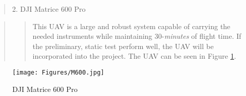 \documentclass{sigchi}
\begin{document}
\begin{quote}
    2. DJI Matrice 600 Pro
\end{quote} 

\begin{quote}
    \begin{quote}
       This UAV is a large and robust system capable of carrying the needed instruments while maintaining 30-\textit{minutes} of flight time. If the preliminary, static test perform well, the UAV will be incorporated into the project. The UAV can be seen in Figure \ref{fig:2}.
    \end{quote}
\end{quote}

\begin{figure}
\centering
    \texttt{[image: Figures/M600.jpg]}
    \caption{DJI Matrice 600 Pro}
    \label{fig:2}
\end{figure}



\end{document}
